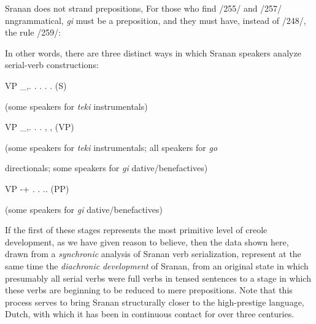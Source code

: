 Sranan does not strand prepositions, For those who find /255/ and /257/ nngrammatical, \textit{gi }must be a preposition, and they must have, instead of /248/, the rule /259/:
 

\ea\label{ex:2:261}

\z

In other words, there are three distinct ways in which Sranan speakers analyze serial-verb constructions:

\ea\label{ex:2:262}
 VP \_,. . . . . (S)  

(some speakers for \textit{teki} instrumentals)

VP \_,. . . , , (VP)

(some speakers for \textit{teki }instrumentals; all speakers for \textit{go}

directionals; some speakers for \textit{gi} dative/benefactives)

VP {}-+ . . .. (PP)

(some speakers for \textit{gi} dative/benefactives)

\z

If the first of these stages represents the most primitive level of creole development, as we have given reason to believe, then the data shown here, drawn from a \textit{synchronic} analysis of Sranan verb serialization, represent at the same time the \textit{diachronic} \textit{development} of Sranan, from an original state in which presumably all serial verbs were full verbs in tensed sentences to a stage in which these verbs are beginning to be reduced to mere prepositions. Note that this process serves to bring Sranan structurally closer to the high-prestige language, Dutch, with which it has been in continuous contact for over three centuries.

